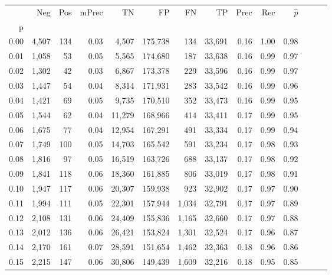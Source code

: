 \begin{tabular}{rrrrrrrrrrrrrr}
\toprule
{} &    Neg &    Pos & mPrec &       TN &       FP &      FN &      TP &  Prec &   Rec & $\hat{p}$ \\
p    &        &        &       &          &          &         &         &       &       &           \\
\midrule
0.00 &  4,507 &    134 &  0.03 &    4,507 &  175,738 &     134 &  33,691 &  0.16 &  1.00 &      0.98 \\
0.01 &  1,058 &     53 &  0.05 &    5,565 &  174,680 &     187 &  33,638 &  0.16 &  0.99 &      0.97 \\
0.02 &  1,302 &     42 &  0.03 &    6,867 &  173,378 &     229 &  33,596 &  0.16 &  0.99 &      0.97 \\
0.03 &  1,447 &     54 &  0.04 &    8,314 &  171,931 &     283 &  33,542 &  0.16 &  0.99 &      0.96 \\
0.04 &  1,421 &     69 &  0.05 &    9,735 &  170,510 &     352 &  33,473 &  0.16 &  0.99 &      0.95 \\
0.05 &  1,544 &     62 &  0.04 &   11,279 &  168,966 &     414 &  33,411 &  0.17 &  0.99 &      0.95 \\
0.06 &  1,675 &     77 &  0.04 &   12,954 &  167,291 &     491 &  33,334 &  0.17 &  0.99 &      0.94 \\
0.07 &  1,749 &    100 &  0.05 &   14,703 &  165,542 &     591 &  33,234 &  0.17 &  0.98 &      0.93 \\
0.08 &  1,816 &     97 &  0.05 &   16,519 &  163,726 &     688 &  33,137 &  0.17 &  0.98 &      0.92 \\
0.09 &  1,841 &    118 &  0.06 &   18,360 &  161,885 &     806 &  33,019 &  0.17 &  0.98 &      0.91 \\
0.10 &  1,947 &    117 &  0.06 &   20,307 &  159,938 &     923 &  32,902 &  0.17 &  0.97 &      0.90 \\
0.11 &  1,994 &    111 &  0.05 &   22,301 &  157,944 &   1,034 &  32,791 &  0.17 &  0.97 &      0.89 \\
0.12 &  2,108 &    131 &  0.06 &   24,409 &  155,836 &   1,165 &  32,660 &  0.17 &  0.97 &      0.88 \\
0.13 &  2,012 &    136 &  0.06 &   26,421 &  153,824 &   1,301 &  32,524 &  0.17 &  0.96 &      0.87 \\
0.14 &  2,170 &    161 &  0.07 &   28,591 &  151,654 &   1,462 &  32,363 &  0.18 &  0.96 &      0.86 \\
0.15 &  2,215 &    147 &  0.06 &   30,806 &  149,439 &   1,609 &  32,216 &  0.18 &  0.95 &      0.85 \\

\end{tabular}
